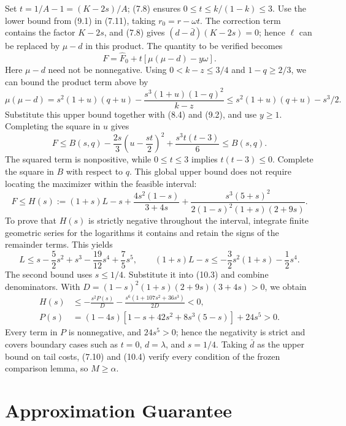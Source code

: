\documentclass[11pt,a4paper]{article}
\begin{document}
Set $t=1/A-1=(K-2s)/A$; (7.8) ensures $0\le t\le k/(1-k)\le3$. Use the lower bound from (9.1) in (7.11), taking $r_0=r-\omega t$. The correction term contains the factor $K-2s$, and (7.8) gives $(d-\bar d)(K-2s)=0$; hence $\ell$ can be replaced by $\mu-d$ in this product. The quantity to be verified becomes
\begin{equation}
F=\widehat F_0+t[\mu(\mu-d)-y\omega].
\tag{10.1}
\end{equation}
Here $\mu-d$ need not be nonnegative. Using $0<k-z\le3/4$ and $1-q\ge2/3$, we can bound the product term above by
\[
\mu(\mu-d)=s^2(1+u)(q+u)
-\frac{s^3(1+u)(1-q)^2}{k-z}
\le s^2(1+u)(q+u)-s^3/2.
\]
Substitute this upper bound together with (8.4) and (9.2), and use $y\ge1$. Completing the square in $u$ gives
\begin{equation}
F\le B(s,q)-\frac{2s}{3}\left(u-\frac{st}{2}\right)^2
+\frac{s^3t(t-3)}6\le B(s,q).
\tag{10.2}
\end{equation}
The squared term is nonpositive, while $0\le t\le3$ implies $t(t-3)\le0$. Complete the square in $B$ with respect to $q$. This global upper bound does not require locating the maximizer within the feasible interval:
\begin{equation}
F\le H(s):=(1+s)L-s+\frac{4s^2(1-s)}{3+4s}
+\frac{s^3(5+s)^2}{2(1-s)^2(1+s)(2+9s)}.
\tag{10.3}
\end{equation}
To prove that $H(s)$ is strictly negative throughout the interval, integrate finite geometric series for the logarithms it contains and retain the signs of the remainder terms. This yields
\[
L\le s-\frac52s^2+s^3-\frac{19}{12}s^4+\frac75s^5,
\qquad
(1+s)L-s\le-\frac32s^2(1+s)-\frac12s^4.
\]
The second bound uses $s\le1/4$. Substitute it into (10.3) and combine denominators. With $D=(1-s)^2(1+s)(2+9s)(3+4s)>0$, we obtain
\begin{equation}
\begin{aligned}
H(s)&\le-\frac{s^2P(s)}D-\frac{s^6(1+107s^2+36s^3)}{2D}<0,\\
P(s)&=(1-4s)[1-s+42s^2+8s^3(5-s)]+24s^5>0.
\end{aligned}
\tag{10.4}
\end{equation}
Every term in $P$ is nonnegative, and $24s^5>0$; hence the negativity is strict and covers boundary cases such as $t=0$, $d=\lambda$, and $s=1/4$. Taking $\bar d$ as the upper bound on tail costs, (7.10) and (10.4) verify every condition of the frozen comparison lemma, so $M\ge\alpha$.

\section{Approximation Guarantee}
\end{document}
